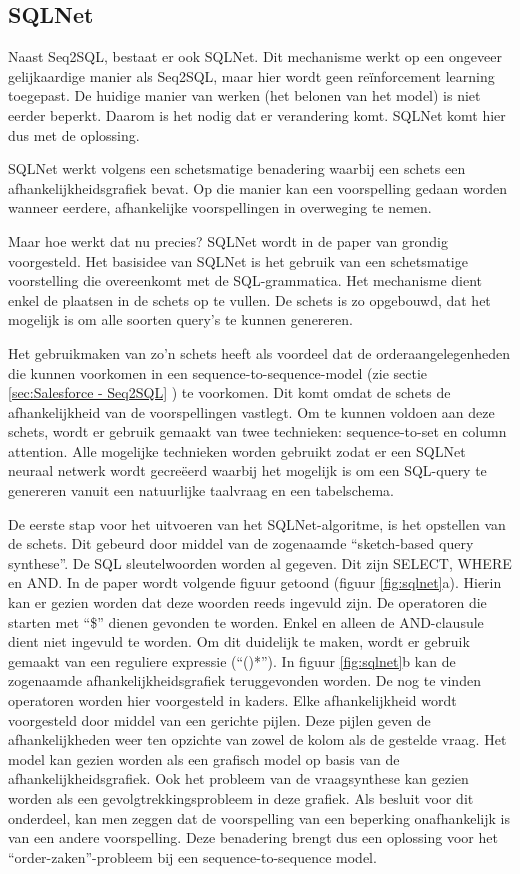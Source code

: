 \subsection{SQLNet}
\label{sec:SQLNet}

Naast Seq2SQL, bestaat er ook SQLNet. Dit mechanisme werkt op een ongeveer gelijkaardige manier als Seq2SQL, maar hier wordt geen reïnforcement learning toegepast. De huidige manier van werken (het belonen van het model) is niet eerder beperkt. Daarom is het nodig dat er verandering komt. SQLNet komt hier dus met de oplossing.

SQLNet werkt volgens een schetsmatige benadering waarbij een schets een afhankelijkheidsgrafiek bevat. Op die manier kan een voorspelling gedaan worden wanneer eerdere, afhankelijke voorspellingen in overweging te nemen. 

Maar hoe werkt dat nu precies? SQLNet wordt in de paper van \textcite{sqlnetPaper} grondig voorgesteld. Het basisidee van SQLNet is het gebruik van een schetsmatige voorstelling die overeenkomt met de SQL-grammatica. Het mechanisme dient enkel de plaatsen in de schets op te vullen. De schets is zo opgebouwd, dat het mogelijk is om alle soorten query’s te kunnen genereren.

Het gebruikmaken van zo’n schets heeft als voordeel dat de orderaangelegenheden die kunnen voorkomen in een sequence-to-sequence-model (zie  sectie \ref{sec:Salesforce - Seq2SQL} ) te voorkomen. Dit komt omdat de schets de afhankelijkheid van de voorspellingen vastlegt. Om te kunnen voldoen aan deze schets, wordt er gebruik gemaakt van twee technieken: sequence-to-set en column attention. Alle mogelijke technieken worden gebruikt zodat er een SQLNet neuraal netwerk wordt gecreëerd waarbij het mogelijk is om een SQL-query te genereren vanuit een natuurlijke taalvraag en een tabelschema.

De eerste stap voor het uitvoeren van het SQLNet-algoritme, is het opstellen van de schets. Dit gebeurd door middel van de zogenaamde “sketch-based query synthese”. De SQL sleutelwoorden worden al gegeven. Dit zijn SELECT, WHERE en AND. In de paper wordt volgende figuur getoond (figuur \ref{fig:sqlnet}a). Hierin kan er gezien worden dat deze woorden reeds ingevuld zijn. De operatoren die starten met “\$” dienen gevonden te worden. Enkel en alleen de AND-clausule dient niet ingevuld te worden. Om dit duidelijk te maken, wordt er gebruik gemaakt van een reguliere expressie (“()*”). In figuur \ref{fig:sqlnet}b kan de zogenaamde afhankelijkheidsgrafiek teruggevonden worden. De nog te vinden operatoren worden hier voorgesteld in kaders. Elke afhankelijkheid wordt voorgesteld door middel van een gerichte pijlen. Deze pijlen geven de afhankelijkheden weer ten opzichte van zowel de kolom als de gestelde vraag. Het model kan gezien worden als een grafisch model op basis van de afhankelijkheidsgrafiek. Ook het probleem van de vraagsynthese kan gezien worden als een gevolgtrekkingsprobleem in deze grafiek. Als besluit voor dit onderdeel, kan men zeggen dat de voorspelling van een beperking onafhankelijk is van een andere voorspelling. Deze benadering brengt dus een oplossing voor het “order-zaken”-probleem bij een sequence-to-sequence model.

